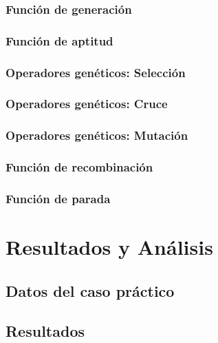\documentclass[12pt,a4paper]{book}
\begin{document}
\subsection{Función de generación}

\subsection{Función de aptitud} \label{Subsec: 4_1_3}

\subsection{Operadores genéticos: Selección}\label{subsec:4_1_4}

\subsection{Operadores genéticos: Cruce}\label{subsec:4_1_5}

\subsection{Operadores genéticos: Mutación}\label{subsec:4_1_6}

\subsection{Función de recombinación}\label{subsec:4_1_7}

\subsection{Función de parada}\label{subsec:4_1_8}




\chapter{Resultados y Análisis} \label{Capítulo 5}



   
\section{Datos del caso práctico} \label{Subsec: 5_1}



\section{Resultados} \label{Subsec: 5_2}
\end{document}
